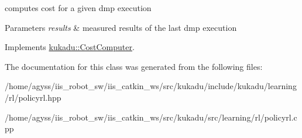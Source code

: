 computes cost for a given dmp execution 


\begin{DoxyParams}{Parameters}
{\em results} & measured results of the last dmp execution \\
\hline
\end{DoxyParams}


Implements \hyperlink{classkukadu_1_1CostComputer_a8d02974e1f097ac0451f03f535843175}{kukadu\+::\+Cost\+Computer}.



The documentation for this class was generated from the following files\+:\begin{DoxyCompactItemize}
\item 
/home/agyss/iis\+\_\+robot\+\_\+sw/iis\+\_\+catkin\+\_\+ws/src/kukadu/include/kukadu/learning/rl/policyrl.\+hpp\item 
/home/agyss/iis\+\_\+robot\+\_\+sw/iis\+\_\+catkin\+\_\+ws/src/kukadu/src/learning/rl/policyrl.\+cpp\end{DoxyCompactItemize}

